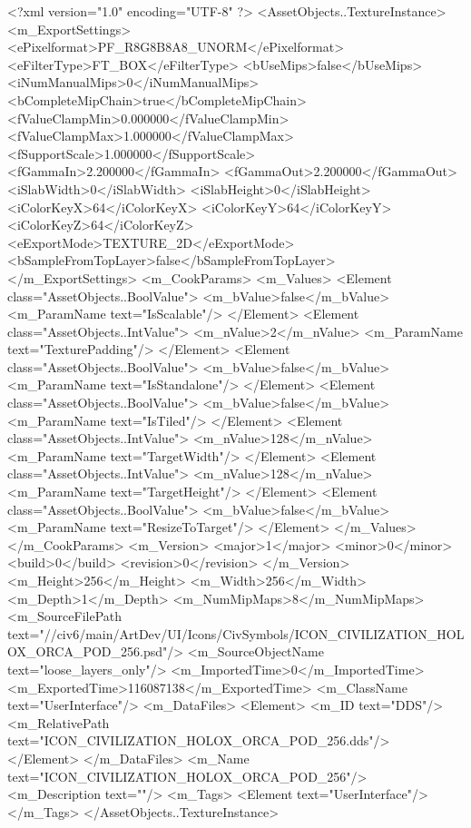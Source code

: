 <?xml version="1.0" encoding="UTF-8" ?>
<AssetObjects..TextureInstance>
	<m_ExportSettings>
		<ePixelformat>PF_R8G8B8A8_UNORM</ePixelformat>
		<eFilterType>FT_BOX</eFilterType>
		<bUseMips>false</bUseMips>
		<iNumManualMips>0</iNumManualMips>
		<bCompleteMipChain>true</bCompleteMipChain>
		<fValueClampMin>0.000000</fValueClampMin>
		<fValueClampMax>1.000000</fValueClampMax>
		<fSupportScale>1.000000</fSupportScale>
		<fGammaIn>2.200000</fGammaIn>
		<fGammaOut>2.200000</fGammaOut>
		<iSlabWidth>0</iSlabWidth>
		<iSlabHeight>0</iSlabHeight>
		<iColorKeyX>64</iColorKeyX>
		<iColorKeyY>64</iColorKeyY>
		<iColorKeyZ>64</iColorKeyZ>
		<eExportMode>TEXTURE_2D</eExportMode>
		<bSampleFromTopLayer>false</bSampleFromTopLayer>
	</m_ExportSettings>
	<m_CookParams>
		<m_Values>
			<Element class="AssetObjects..BoolValue">
				<m_bValue>false</m_bValue>
				<m_ParamName text="IsScalable"/>
			</Element>
			<Element class="AssetObjects..IntValue">
				<m_nValue>2</m_nValue>
				<m_ParamName text="TexturePadding"/>
			</Element>
			<Element class="AssetObjects..BoolValue">
				<m_bValue>false</m_bValue>
				<m_ParamName text="IsStandalone"/>
			</Element>
			<Element class="AssetObjects..BoolValue">
				<m_bValue>false</m_bValue>
				<m_ParamName text="IsTiled"/>
			</Element>
			<Element class="AssetObjects..IntValue">
				<m_nValue>128</m_nValue>
				<m_ParamName text="TargetWidth"/>
			</Element>
			<Element class="AssetObjects..IntValue">
				<m_nValue>128</m_nValue>
				<m_ParamName text="TargetHeight"/>
			</Element>
			<Element class="AssetObjects..BoolValue">
				<m_bValue>false</m_bValue>
				<m_ParamName text="ResizeToTarget"/>
			</Element>
		</m_Values>
	</m_CookParams>
	<m_Version>
		<major>1</major>
		<minor>0</minor>
		<build>0</build>
		<revision>0</revision>
	</m_Version>
	<m_Height>256</m_Height>
	<m_Width>256</m_Width>
	<m_Depth>1</m_Depth>
	<m_NumMipMaps>8</m_NumMipMaps>
	<m_SourceFilePath text="//civ6/main/ArtDev/UI/Icons/CivSymbols/ICON_CIVILIZATION_HOLOX_ORCA_POD_256.psd"/>
	<m_SourceObjectName text="loose_layers_only"/>
	<m_ImportedTime>0</m_ImportedTime>
	<m_ExportedTime>116087138</m_ExportedTime>
	<m_ClassName text="UserInterface"/>
	<m_DataFiles>
		<Element>
			<m_ID text="DDS"/>
			<m_RelativePath text="ICON_CIVILIZATION_HOLOX_ORCA_POD_256.dds"/>
		</Element>
	</m_DataFiles>
	<m_Name text="ICON_CIVILIZATION_HOLOX_ORCA_POD_256"/>
	<m_Description text=""/>
	<m_Tags>
		<Element text="UserInterface"/>
	</m_Tags>
</AssetObjects..TextureInstance>

